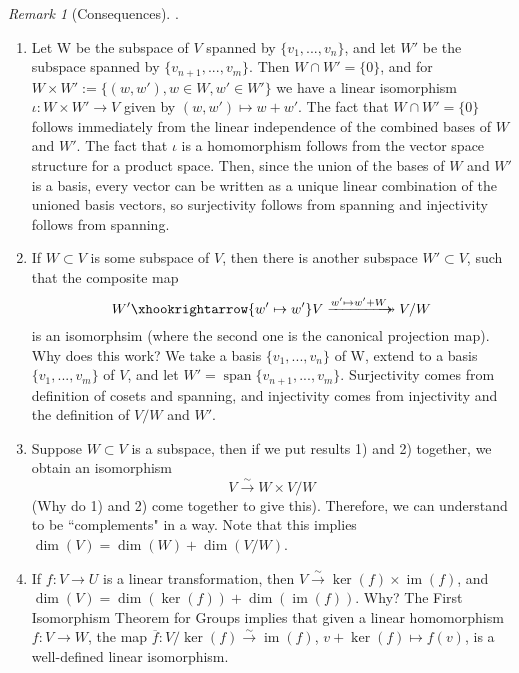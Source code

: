 \documentclass[12pt]{article}
\theoremstyle{definition}
\theoremstyle{remark}
\newtheorem{rmk}[thm]{Remark}
\numberwithin{equation}{section}
\DeclareMathOperator{\im}{im}
\DeclareMathOperator{\spn}{span}
\newcommand{\xtwoheadrightarrow}[2][]{%
          \xrightarrow[#1]{#2}\mathrel{\mkern-14mu}\twoheadrightarrow
}
\begin{document}
\begin{rmk}[Consequences]
        .\newline \begin{enumerate}
                \item Let W be the subspace of $V$ spanned by $\{v_1,...,v_n\}$, and let $W'$ be the subspace spanned by $\{v_{n+1},...,v_{m}\}$. Then $W\cap W' = \{0\}$, and for $W\times W' := \{(w,w'), w\in W, w' \in W'\}$ we have a linear isomorphism $\iota: W \times W' \rightarrow V$ given by $(w,w') \mapsto w + w'$. The fact that $W \cap W' = \{0\}$ follows immediately from the linear independence of the combined bases of $W$ and $W'$. The fact that $\iota$ is a homomorphism follows from the vector space structure for a product space. Then, since the union of the bases of $W$ and $W'$ is a basis, every vector can be written as a unique linear combination of the unioned basis vectors, so surjectivity follows from spanning and injectivity follows from spanning.
                \item If $W \subset V$ is some subspace of $V$, then there is another subspace $W' \subset V$, such that the composite map \begin{equation}
                                W' \xhookrightarrow{w'\mapsto w'} V\xtwoheadrightarrow{w'\mapsto w' + W} V/W
                \end{equation}
                        is an isomorphsim (where the second one is the canonical projection map). Why does this work? We take a basis $\{v_1,...,v_n\}$ of W, extend to a basis $\{v_1,...,v_m\}$ of $V$, and let $W' = \spn\{v_{n+1},...,v_m\}$. Surjectivity comes from definition of cosets and spanning, and injectivity comes from injectivity and the definition of $V/W$ and $W'$.
                \item Suppose $W \subset V$ is a subspace, then if we put results 1) and 2) together, we obtain an isomorphism \begin{equation}
                                V\xrightarrow{\sim} W \times V/W
                \end{equation}
                        (Why do 1) and 2) come together to give this). Therefore, we can understand to be ``complements" in a way. Note that this implies $\dim(V) = \dim(W) + \dim(V/W)$.
                \item If $f:V\rightarrow U$ is a linear transformation, then $V \xrightarrow{\sim} \ker(f)\times\im(f)$, and $\dim(V) = \dim(\ker(f)) + \dim(\im(f))$. Why? The First Isomorphism Theorem for Groups implies that given a linear homomorphism $f:V\rightarrow W$, the map $\overline{f}:V/\ker(f)\xrightarrow{\sim} \im(f)$, $v+\ker(f)\mapsto f(v)$, is a well-defined linear isomorphism. 
        \end{enumerate}
\end{rmk}
\end{document}
